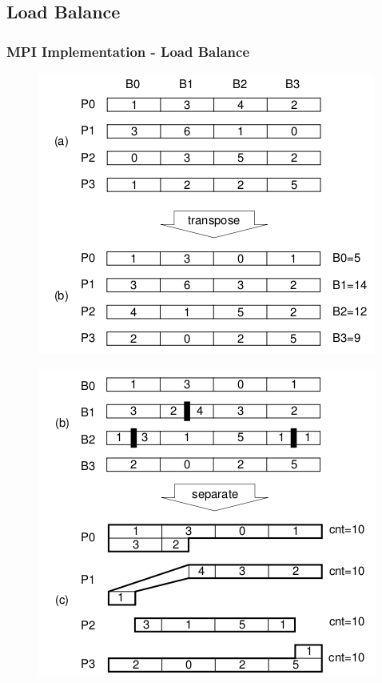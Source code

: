 \subsection{Load Balance}

\begin{frame}
	\frametitle{MPI Implementation - Load Balance}

	\begin{minipage}[b]{0.45\linewidth}
		\begin{figure}[!htpb]
			\begin{center}
				\includegraphics[width=\textwidth]{images/mpi}
			\end{center}
		\end{figure}
	\end{minipage}
	\hspace{0.5cm}
	\begin{minipage}[b]{0.45\linewidth}
		\begin{figure}[!htpb]
			\begin{center}
				\includegraphics[width=\textwidth]{images/mpi_bal}

\end{center}
\end{figure}
\end{minipage}
\end{frame}
